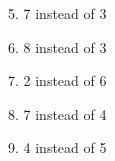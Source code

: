 \documentclass[twoside,10pt,a4paper]{article}
\theoremstyle{definition}
\theoremstyle{definition}
\theoremstyle{remark}
\renewcommand{\>}{{\rightarrow}}
\newcommand{\1}{{\mathbf 1}}
\newcommand{\0}{{\mathbf 0}}
\begin{document}
5. 7 instead of 3

\begin{center}
\end{center}

6. 8 instead of 3

\begin{center}
\end{center}

7. 2 instead of 6

\begin{center}
\end{center}

8. 7 instead of 4

\begin{center}
\end{center}

9. 4 instead of 5

\begin{center}
\end{center}
\end{document}
